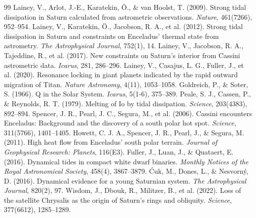\documentclass[11pt,a4paper]{article}
\begin{document}
\begin{thebibliography}{99}
 Lainey, V., Arlot, J.-E., Karatekin, {\"O}., \& van Hoolst, T. (2009). Strong tidal dissipation in Saturn calculated from astrometric observations. \textit{Nature}, 461(7266), 952--954.
 Lainey, V., Karatekin, {\"O}., Jacobson, R. A., et al. (2012). Strong tidal dissipation in Saturn and constraints on Enceladus' thermal state from astrometry. \textit{The Astrophysical Journal}, 752(1), 14.
 Lainey, V., Jacobson, R. A., Tajeddine, R., et al. (2017). New constraints on Saturn's interior from Cassini astrometric data. \textit{Icarus}, 281, 286--296.
 Lainey, V., Casajus, L. G., Fuller, J., et al. (2020). Resonance locking in giant planets indicated by the rapid outward migration of Titan. \textit{Nature Astronomy}, 4(11), 1053--1058.
 Goldreich, P., \& Soter, S. (1966). Q in the Solar System. \textit{Icarus}, 5(1-6), 375--389.
 Peale, S. J., Cassen, P., \& Reynolds, R. T. (1979). Melting of Io by tidal dissipation. \textit{Science}, 203(4383), 892--894.
 Spencer, J. R., Pearl, J. C., Segura, M., et al. (2006). Cassini encounters Enceladus: Background and the discovery of a south polar hot spot. \textit{Science}, 311(5766), 1401--1405.
 Howett, C. J. A., Spencer, J. R., Pearl, J., \& Segura, M. (2011). High heat flow from Enceladus' south polar terrain. \textit{Journal of Geophysical Research: Planets}, 116(E3).
 Fuller, J., Luan, J., \& Quataert, E. (2016). Dynamical tides in compact white dwarf binaries. \textit{Monthly Notices of the Royal Astronomical Society}, 458(4), 3867--3879.
 {\'C}uk, M., Dones, L., \& Nesvorn{\'y}, D. (2016). Dynamical evidence for a young Saturnian system. \textit{The Astrophysical Journal}, 820(2), 97.
 Wisdom, J., Dbouk, R., Militzer, B., et al. (2022). Loss of the satellite Chrysalis as the origin of Saturn's rings and obliquity. \textit{Science}, 377(6612), 1285--1289.
\end{thebibliography}

\appendix
\end{document}
